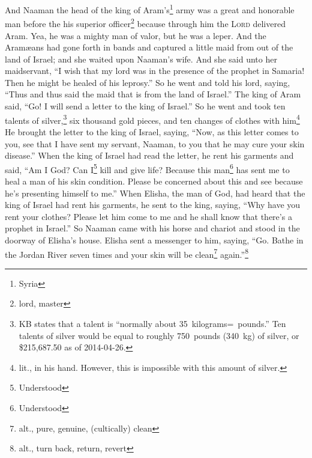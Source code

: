 
\begin{inparaenum}
     And Naaman the head of the king of Aram's\footnote{Syria} army was a great and honorable man before the his superior officer\footnote{lord, master} because through him the \textsc{Lord} delivered Aram. Yea, he was a mighty man of valor, but he was a leper.%
     And the Aram\ae{}ans had gone forth in bands and captured a little maid from out of the land of Israel; and she waited upon Naaman's wife.%
     And she said unto her maidservant, ``I wish that my lord was in the presence of the prophet in Samaria! Then he might be healed of his leprosy.''%
     So he went and told his lord, saying, ``Thus and thus said the maid that is from the land of Israel.''%
     The king of Aram said, ``Go! I will send a letter to the king of Israel.'' So he went and took ten talents of silver,\footnote{KB states that a talent is ``normally about 35~kilograms\thinspace=~pounds.'' Ten talents of silver would be equal to roughly 750~pounds (340~kg) of silver, or \$215,687.50 as of 2014-04-26.} six thousand gold pieces, and ten changes of clothes with him\footnote{lit., in his hand. However, this is impossible with this amount of silver.}%
     He brought the letter to the king of Israel, saying, ``Now, as this letter comes to you, see that I have sent my servant, Naaman, to you that he may cure your skin disease.''%
     When the king of Israel had read the letter, he rent his garments and said, ``Am I God? Can I\footnote{Understood} kill and give life? Because this man\footnote{Understood} has sent me to heal a man of his skin condition. Please be concerned about this and see because he's presenting himself to me.''%
     When Elisha, the man of God, had heard that the king of Israel had rent his garments, he sent to the king, saying, ``Why have you rent your clothes? Please let him come to me and he shall know that there's a prophet in Israel.''%
     So Naaman came with his horse and chariot and stood in the doorway of Elisha's house.%
     Elisha sent a messenger to him, saying, ``Go. Bathe in the Jordan River seven times and your skin will be clean\footnote{alt., pure, genuine, (cultically) clean} again.''\footnote{alt., turn back, return, revert}%

\end{inparaenum}

